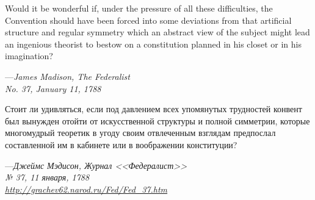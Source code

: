 \null
\vskip 1in

\begingroup
\raggedright
\list{}{\rightmargin=8pc \leftmargin=8pc}\item[] \small
Would it be wonderful if, under the pressure of all these difficulties,
the Convention should have been forced into some deviations from that
artificial structure and regular symmetry which an abstract view of the
subject might lead an ingenious theorist to bestow on a constitution
planned in his closet or in his imagination?
\par\vskip 4pt
\begin{tabbing}
---\=\emph{James Madison, The Federalist} \\
\>\emph{No. 37, January 11, 1788}
\end{tabbing}
\endlist
\endgroup

\newpage 

\null
\vskip 1in

\begingroup
\raggedright
\list{}{\rightmargin=8pc \leftmargin=8pc}\item[] \small
Стоит ли удивляться, если под давлением всех упомянутых трудностей конвент был
вынужден отойти от искусственной структуры и полной симметрии, которые
многомудрый теоретик в угоду своим отвлеченным взглядам предпослал составленной
им в кабинете или в воображении конституции?

\par\vskip 4pt
\begin{tabbing}
---\=\emph{Джеймс Мэдисон, Журнал <<Федералист>>} \\
\>\emph{№ 37, 11 января, 1788} \\
\>\emph{\href{http://grachev62.narod.ru/Fed/Fed\_37.htm}{http://grachev62.narod.ru/Fed/Fed\_37.htm}}
\end{tabbing}
\endlist
\endgroup

